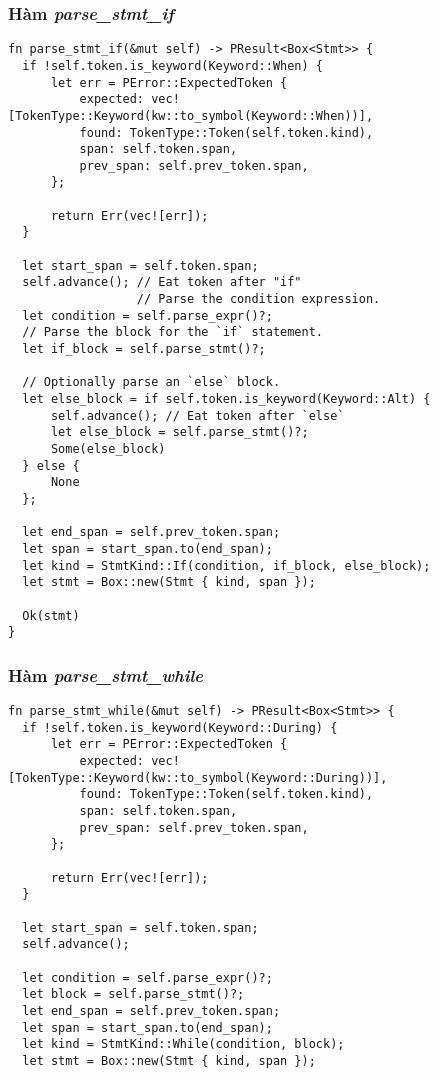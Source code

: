 {\subsubsection{Hàm \textit{parse\_stmt\_if}}
\label{ap1:stmt_when}
\begin{lstlisting}
fn parse_stmt_if(&mut self) -> PResult<Box<Stmt>> {
  if !self.token.is_keyword(Keyword::When) {
      let err = PError::ExpectedToken {
          expected: vec![TokenType::Keyword(kw::to_symbol(Keyword::When))],
          found: TokenType::Token(self.token.kind),
          span: self.token.span,
          prev_span: self.prev_token.span,
      };

      return Err(vec![err]);
  }

  let start_span = self.token.span;
  self.advance(); // Eat token after "if"
                  // Parse the condition expression.
  let condition = self.parse_expr()?;
  // Parse the block for the `if` statement.
  let if_block = self.parse_stmt()?;

  // Optionally parse an `else` block.
  let else_block = if self.token.is_keyword(Keyword::Alt) {
      self.advance(); // Eat token after `else`
      let else_block = self.parse_stmt()?;
      Some(else_block)
  } else {
      None
  };

  let end_span = self.prev_token.span;
  let span = start_span.to(end_span);
  let kind = StmtKind::If(condition, if_block, else_block);
  let stmt = Box::new(Stmt { kind, span });

  Ok(stmt)
}
\end{lstlisting}

\subsubsection{Hàm \textit{parse\_stmt\_while}}
\label{ap1:stmt_during}
\begin{lstlisting}
fn parse_stmt_while(&mut self) -> PResult<Box<Stmt>> {
  if !self.token.is_keyword(Keyword::During) {
      let err = PError::ExpectedToken {
          expected: vec![TokenType::Keyword(kw::to_symbol(Keyword::During))],
          found: TokenType::Token(self.token.kind),
          span: self.token.span,
          prev_span: self.prev_token.span,
      };

      return Err(vec![err]);
  }

  let start_span = self.token.span;
  self.advance();

  let condition = self.parse_expr()?;
  let block = self.parse_stmt()?;
  let end_span = self.prev_token.span;
  let span = start_span.to(end_span);
  let kind = StmtKind::While(condition, block);
  let stmt = Box::new(Stmt { kind, span });


\end{lstlisting}}
